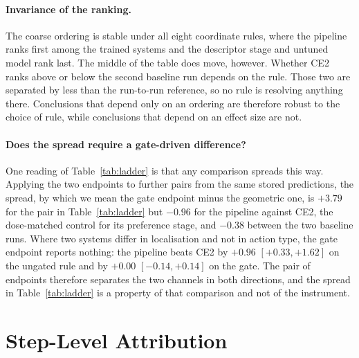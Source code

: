 \documentclass[runningheads,a4paper]{llncs}
\begin{document}
\paragraph{Invariance of the ranking.}
The coarse ordering is stable under all eight coordinate rules, where the pipeline ranks first
among the trained systems and the descriptor stage and untuned model rank last. The middle of the
table does move, however. Whether
CE2 ranks above or below the second baseline run depends on the rule. Those two are separated by
less than the run-to-run reference, so no rule is resolving anything there. Conclusions that depend only
on an ordering are therefore robust to the choice of rule, while conclusions that depend on an
effect size are not.

\paragraph{Does the spread require a gate-driven difference?}
One reading of Table~\ref{tab:ladder} is that any comparison spreads this way.
Applying the two endpoints to further pairs from the same stored predictions, the spread, by
which we mean the gate endpoint minus the geometric one, is $+3.79$ for the pair in
Table~\ref{tab:ladder} but $-0.96$ for the pipeline against CE2, the dose-matched control for its preference stage, and
$-0.38$ between the two baseline runs. Where two systems differ in localisation and not in action
type, the gate endpoint reports nothing: the pipeline beats CE2 by $+0.96$ $[+0.33,+1.62]$ on the
ungated rule and by $+0.00$ $[-0.14,+0.14]$ on the gate. The pair of endpoints therefore
separates the two channels in both directions, and the spread in Table~\ref{tab:ladder} is a
property of that comparison and not of the instrument.

\section{Step-Level Attribution}
\label{sec:where}
\end{document}
